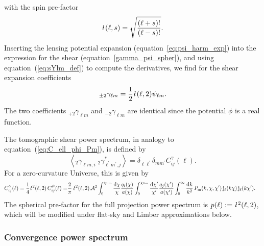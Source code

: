 \documentclass[fleqn,usenatbib]{mnras} %
\newcommand{\ellbar}{\hbox{\it \l}\,}
\newcommand{\pref}{{\cal A}}
\begin{document}
%
with the spin pre-factor \citep{2012PhRvD..86b3001B}
%
\begin{equation}
  \ellbar(\ell, s) = \sqrt{\frac{(\ell + s)!}{(\ell - s)!}}.
  \label{eq:ellbar}
\end{equation} 
%
Inserting the lensing potential expansion (equation~\ref{eq:psi_harm_exp}) into the
expression for the shear (equation~\ref{gamma_psi_spher}), and using equation~(\ref{eq:sYlm_def})
to compute the derivatives, we find for the shear expansion coefficients
\citep{2000PhRvD..62d3007H,2001astro.ph.11605T}
%
%
\begin{equation}
  _{\pm 2} \gamma_{\ell m} = \frac 1 2 \ellbar(\ell, 2) \psi_{\ell m}.
  \label{eq:gamma_ellm_phi_ellm}
\end{equation}
%
The two coefficients $_{+2} \gamma_{\ell m}$ and $_{-2} \gamma_{\ell m}$ are
identical since the potential $\phi$ is a real function.

The tomographic shear power spectrum, in analogy to equation~(\ref{eq:C_ell_phi_Pm}), is defined by
%
\begin{equation}
  \left\langle _2\gamma^{}_{\ell m, i} \; {}_2\gamma^\ast_{\ell^\prime m^\prime, j} \right\rangle
    = \delta_{\ell \ell^\prime} \delta_{m m^\prime} C^\gamma_{ij}(\ell).
  \label{eq:C_ell_gamma}
\end{equation}
%
For a zero-curvature Universe, this is given by
%
\begin{align}
  C^\gamma_{ij}(\ell) = \frac 1 4 \ellbar^2(\ell, 2) \, C^\psi_{ij}(\ell)
                 = & \frac 2 \pi \, \ellbar^2(\ell, 2) \, \pref^2
                 \int_{0}^{\chi_{\rm lim}} \frac{\rm d \chi}{\chi} \frac{q_i(\chi)}{a(\chi)}
                \int_{0}^{\chi_{\rm lim}} \frac{\rm d \chi^\prime}{\chi^\prime}
                \frac{q_j(\chi^\prime)}{a(\chi^\prime)}
                \int_0^\infty \frac{{\rm d} k}{k^2} \, P_{\rm m}(k, \chi, \chi^\prime) \,
                {\rm j}_\ell(k \chi) \, {\rm j}_\ell(k \chi^\prime) .
  \label{eq:C_ell_full}
\end{align}
%
The spherical pre-factor for the full projection power spectrum is $p(\ell) :=
\ellbar^2(\ell, 2)$, which will be modified under flat-sky and Limber
approximations below.

\subsubsection{Convergence power spectrum}
\end{document}
